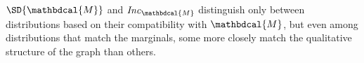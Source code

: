 \documentclass{article}
\theoremstyle{plain}
\theoremstyle{definition}
\theoremstyle{remark}
\newcommand{\commentout}[1]{\ignorespaces}
\newcommand{\V}{\mathcal V}
\newcommand{\dg}[1]{\mathbdcal{#1}}
\newcommand\Inc{\mathit{Inc}}
\newcommand{\ed}[3]{#2
  \overset{\smash{\mskip-5mu\raisebox{-1pt}{$\scriptscriptstyle
        #1$}}}{\rightarrow} #3}
\numberwithin{equation}{section}
\begin{document}
$\SD{\dg M}$ and $\Inc_{\dg M}$ distinguish only
between distributions based on their compatibility with
$\dg M$, but even among distributions that match the
marginals, some more closely match the qualitative structure
of the graph than others.  
\commentout{
Suppose an agent has a PDG $\dg M$ in mind, and imagines that all sample
variation in a joint distribution $\mu$ over $\V(\dg M)$ arises as a result
of sampling the value of a target variable $Y$ of some edge $\ed LXY$, given the
value of $X$. If this is the case, one would expect the total amount of
information required to communicate a sample of $\mu$ to be the same as the
total amount of the information required to separately encode, for
each edge $\ed LXY$, the randomness of $Y$ given $X$.

}
\end{document}
